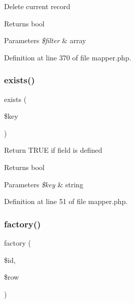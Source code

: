 Delete current record \begin{DoxyReturn}{Returns}
bool 
\end{DoxyReturn}

\begin{DoxyParams}{Parameters}
{\em \$filter} & array \\
\hline
\end{DoxyParams}


Definition at line 370 of file mapper.\+php.

\hypertarget{class_d_b_1_1_jig_1_1_mapper_ace1ae5be37bf26c172cc7ea4e1a65e26}{}\label{class_d_b_1_1_jig_1_1_mapper_ace1ae5be37bf26c172cc7ea4e1a65e26} 
\subsubsection{\texorpdfstring{exists()}{exists()}}
{\footnotesize\ttfamily exists (\begin{DoxyParamCaption}\item[{}]{\$key }\end{DoxyParamCaption})}

Return T\+R\+UE if field is defined \begin{DoxyReturn}{Returns}
bool 
\end{DoxyReturn}

\begin{DoxyParams}{Parameters}
{\em \$key} & string \\
\hline
\end{DoxyParams}


Definition at line 51 of file mapper.\+php.

\hypertarget{class_d_b_1_1_jig_1_1_mapper_a42470c7265ee40e95bb2beed36d8c7c9}{}\label{class_d_b_1_1_jig_1_1_mapper_a42470c7265ee40e95bb2beed36d8c7c9} 
\subsubsection{\texorpdfstring{factory()}{factory()}}
{\footnotesize\ttfamily factory (\begin{DoxyParamCaption}\item[{}]{\$id,  }\item[{}]{\$row }\end{DoxyParamCaption})\hspace{0.3cm}{\ttfamily [protected]}}

